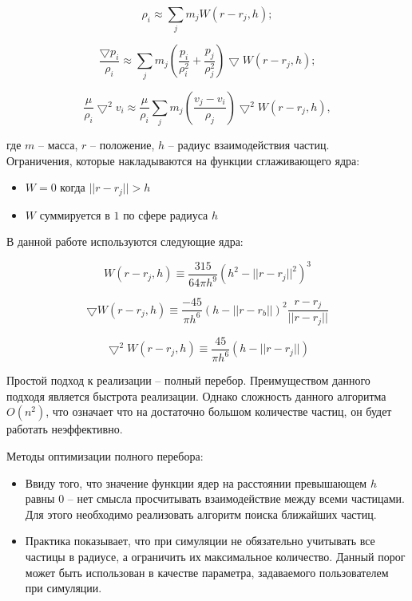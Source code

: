 \begin{equation}
\label{eq:}
  \rho_i \approx \sum_{j}m_jW(r - r_j, h);
\end{equation}

\begin{equation}
\label{eq:}
\frac{\bigtriangledown{}p_i}{\rho_i} \approx \sum_{j}m_j(\frac{p_i}{\rho_i^2} + \frac{p_j}{\rho_j^2})\bigtriangledown{}W(r - r_j, h);
\end{equation}

\begin{equation}
\label{eq:}
\frac{\mu}{\rho_i}\bigtriangledown^2v_i \approx \frac{\mu}{\rho_i}\sum_{j}m_j(\frac{v_j - v_i}{\rho_j})\bigtriangledown^2W(r - r_j, h),
\end{equation} 

где $m$ -- масса, $r$ -- положение, $h$ -- радиус взаимодействия частиц. \\

Ограничения, которые накладываются на функции сглаживающего ядра:

\begin{itemize}
  \item $W = 0$ когда $||r - r_j|| > h$
  \item $W$ суммируется в $1$ по сфере радиуса $h$
\end{itemize}

В данной работе используются следующие ядра:

\begin{equation}
\label{eq:}
W(r - r_j, h) \equiv \frac{315}{64\pi{}h^9}(h^2-||r-r_j||^2)^3
\end{equation}

\begin{equation}
\label{eq:}
\bigtriangledown{}W(r - r_j, h) \equiv \frac{-45}{\pi{}h^6}(h - ||r - r_b||)^2\frac{r - r_j}{||r - r_j||}
\end{equation}

\begin{equation}
\label{eq:}
\bigtriangledown^2W(r - r_j, h) \equiv \frac{45}{\pi{}h^6}(h - ||r - r_j||)
\end{equation}

Простой подход к реализации -- полный перебор. Преимуществом данного подходя является быстрота
реализации. Однако сложность данного алгоритма $O(n^2)$, что означает что на достаточно большом
количестве частиц, он будет работать неэффективно.

Методы оптимизации полного перебора:

\begin{itemize}
  \item Ввиду того, что значение функции ядер на расстоянии превышающем $h$ равны 0 -- нет смысла
    просчитывать взаимодействие между всеми частицами. Для этого необходимо реализовать
    алгоритм поиска ближайших частиц.
  \item Практика показывает, что при симуляции не обязательно учитывать все частицы в радиусе, а
    ограничить их максимальное количество. Данный порог может быть использован в качестве
    параметра, задаваемого пользователем при симуляции.
\end{itemize}

